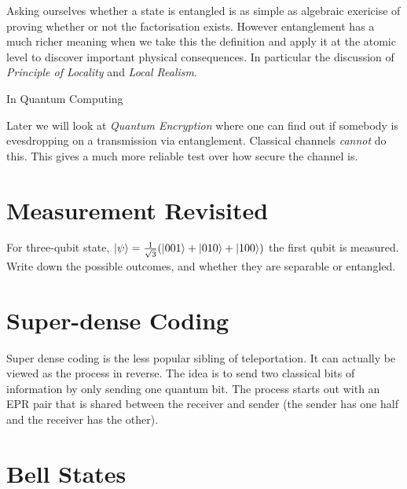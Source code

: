 Asking ourselves whether a state is entangled is as simple as algebraic 
exericise of proving whether or not the factorisation exists. 
However entanglement has a much richer meaning when we take this 
the definition and apply it at the atomic level to discover important physical consequences. 
In particular the discussion of \textit{Principle of Locality} and \textit{Local Realism}.


In Quantum Computing

Later we will look at \textit{Quantum Encryption} where one can find out if somebody is 
evesdropping on a transmission via entanglement. Classical channels \textit{cannot} do this.
This gives a much more reliable test over how secure the channel is. 

\section{Measurement Revisited}


\begin{example}
For three-qubit state, $\left|\psi\right\rangle = \frac{1}{\sqrt{3}}(\left|001\right\rangle + \left|010\right\rangle + \left|100\right\rangle)$
the first qubit is measured. Write down the possible outcomes,
and whether they are separable or entangled.


\end{example}






\section{Super-dense Coding}

Super dense coding is the less popular sibling of teleportation. It can actually be viewed as the
process in reverse. The idea is to send two classical bits of information by only sending one
quantum bit. The process starts out with an EPR pair that is shared between the receiver and
sender (the sender has one half and the receiver has the other).


\section{Bell States}


